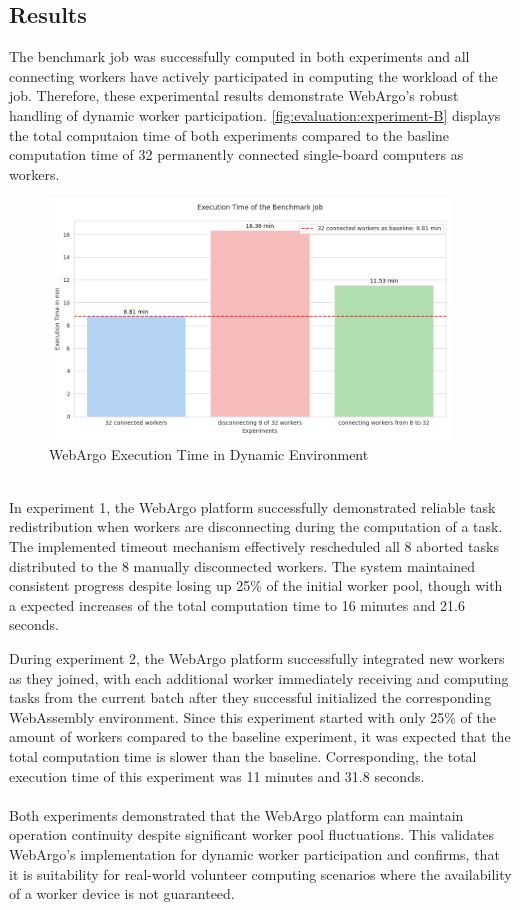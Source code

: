 \subsection{Results}
The benchmark job was successfully computed in both experiments and all connecting workers have actively participated in computing the workload of the job. Therefore, these experimental results demonstrate WebArgo's robust handling of dynamic worker participation. \autoref{fig:evaluation:experiment-B} displays the total computaion time of both experiments compared to the basline computation time of 32 permanently connected single-board computers as workers.

\begin{figure}[htbp]
    \centering
    \includegraphics[width=0.95\textwidth]{gfx/figures/Evaluation_B.png}
    \caption{WebArgo Execution Time in Dynamic Environment}
    \label{fig:evaluation:experiment-B}
\end{figure}
~\\
In experiment 1, the WebArgo platform successfully demonstrated reliable task redistribution when workers are disconnecting during the computation of a task. The implemented timeout mechanism effectively rescheduled all 8 aborted tasks distributed to the 8 manually disconnected workers. The system maintained consistent progress despite losing up 25\% of the initial worker pool, though with a expected increases of the total computation time to 16 minutes and 21.6 seconds.

During experiment 2, the WebArgo platform successfully integrated new workers as they joined, with each additional worker immediately receiving and computing tasks from the current batch after they successful initialized the corresponding WebAssembly environment. Since this experiment started with only 25\% of the amount of workers compared to the baseline experiment, it was expected that the total computation time is slower than the baseline. Corresponding, the total execution time of this experiment was 11 minutes and 31.8 seconds. 
\\~\\
Both experiments demonstrated that the WebArgo platform can maintain operation continuity despite significant worker pool fluctuations. This validates WebArgo's implementation for dynamic worker participation and confirms, that it is suitability for real-world volunteer computing scenarios where the availability of a worker device is not guaranteed.

